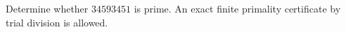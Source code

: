 Determine whether $ 34593451 $ is prime. An exact finite primality certificate by trial division is allowed.
